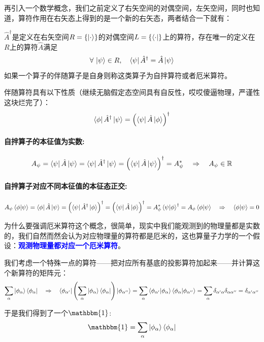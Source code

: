 再引入一个数学概念，我们之前定义了右矢空间的对偶空间，左矢空间，同时也知道，算符作用在右矢态上得到的是一个新的右矢态，两者结合一下就有：
\begin{definition}[伴随算符]
$\hat{A}^{\dagger}$是定义在右矢空间$R=\{\ket{\cdot}\}$的对偶空间$L=\{\bra{\cdot}\}$上的算符，存在唯一的定义在$R$上的算符$\hat{A}$满足
\[\forall \, \ket{\psi} \in R, \quad \bra{\psi}\hat{A}^{\dagger}=\hat{A}\ket{\psi}\]
如果一个算子的伴随算子是自身则称这类算子为自拌算符或者厄米算符。
\end{definition}

伴随算符具有以下性质（继续无脑假定态空间具有自反性，哎哎傻逼物理，严谨性这块烂完了）：
\[\bra{\phi}\hat{A}^{\dagger}\ket{\psi}=\left(\bra{\psi}\hat{A}\ket{\phi}\right)^{\dagger}\]

\paragraph*{自拌算子的本征值为实数:}
\[A_{\psi}=\bra{\psi}\hat{A}\ket{\psi}=\bra{\psi}\hat{A}^{\dagger}\ket{\psi}=\left(\bra{\psi}\hat{A}\ket{\psi}\right)^{\dagger}=A_{\psi}^* \quad \Rightarrow \quad A_{\psi}\in\mathbb{R}\]

\paragraph*{自拌算子对应不同本征值的本征态正交:}
\[A_{\psi}\bra{\phi}\ket{\psi}=\bra{\phi}\hat{A}\ket{\psi}=\left(\bra{\psi}\hat{A}^{\dagger}\ket{\phi}\right)^{\dagger}=\left(\bra{\psi}\hat{A}\ket{\phi}\right)^{\dagger}=A_{\phi}^*\bra{\psi}\ket{\phi}^{\dagger}=A_{\phi}\bra{\phi}\ket{\psi} \quad \Rightarrow \quad \bra{\phi}\ket{\psi}=0\]

为什么要强调厄米算符这个概念，很简单，现实中我们能观测到的物理量都是实数的，我们自然而然会认为对应物理量的算符都是厄米的，这也算量子力学的一个假设：\textcolor{blue}{\textbf{观测物理量都对应一个厄米算符}}。

我们考虑一个特殊一点的算符——把对应所有基底的投影算符加起来——并计算这个新算符的矩阵元：
\[\sum_{\alpha}\ket{\phi_{\alpha}}\bra{\phi_{\alpha}} \quad \Rightarrow \quad \bra{\phi_{\alpha'}}\left(\sum_{\alpha}\ket{\phi_{\alpha}}\bra{\phi_{\alpha}}\right)\ket{\phi_{\alpha''}}=\sum_{\alpha}\bra{\phi_{\alpha'}}\ket{\phi_{\alpha}}\bra{\phi_{\alpha}}\ket{\phi_{\alpha''}}=\sum_{\alpha}\delta_{\alpha'\alpha}\delta_{\alpha\alpha''}=\delta_{\alpha'\alpha''}\]

于是我们得到了一个$\mathbbm{1}$:
\[\mathbbm{1}=\sum_{\alpha}\ket{\phi_{\alpha}}\bra{\phi_{\alpha}}\]

